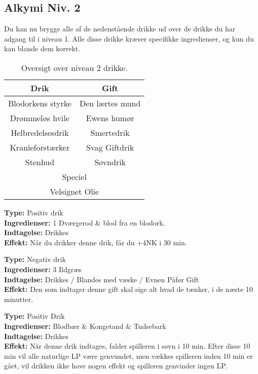 \subsection{Alkymi Niv. 2}
Du kan nu brygge alle af de nedenstående drikke ud over de drikke du har adgang til i niveau 1. Alle disse drikke kræver specifikke ingredienser, og kun du kan blande dem korrekt.\\

\begin{table}[H]
    \centering
    \begin{tabular}{|c|c|}
        \rowcolor{cerulean!80}\hline
        Drik & Gift \\\hline
        Blodorkens styrke &  Den lærtes mund \\\hline
        Drømmeløs hvile & Ewens humør \\\hline
        Helbredelsesdrik & Smertedrik \\\hline
        Kranieforstærker & Svag Giftdrik\\\hline
        Stenhud &  Søvndrik\\\hline
        \multicolumn{2}{|c|}{Speciel} \\\hline
        \multicolumn{2}{|c|}{Velsignet Olie} \\\hline
    \end{tabular}
    \caption{Oversigt over niveau 2 drikke.}
\end{table}

\begin{drik*}
\textbf{Type:} Positiv drik \\
\textbf{Ingredienser:} 1 Dværgerod \& blod fra en blodork.\\
\textbf{Indtagelse:} Drikkes\\
\textbf{Effekt:} Når du drikker denne drik, får du +4NK i 30 min.
\end{drik*}

\begin{gift*}
\textbf{Type:} Negativ drik\\
\textbf{Ingredienser:} 3 Ildgræs\\
\textbf{Indtagelse:} Drikkes / Blandes med væske / Evnen Påfør Gift\\
\textbf{Effekt:} Den som indtager denne gift skal sige alt hvad de tænker, i de næste 10 minutter.
\end{gift*}

\begin{drik*}
\textbf{Type:} Positiv Drik\\
\textbf{Ingredienser:} Blodbær \& Kongetand \& Tudsebark \\
\textbf{Indtagelse:} Drikkes\\
\textbf{Effekt:} Når denne drik indtages, falder spilleren i søvn i 10 min. Efter disse 10 min vil alle naturlige LP være genvundet, men vækkes spilleren inden 10 min er gået, vil drikken ikke have nogen effekt og spilleren genvinder ingen LP.\\
\end{drik*}

